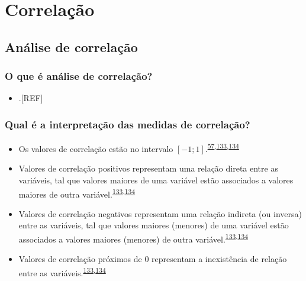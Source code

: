 \documentclass[
  a4paper,
]{book}
\providecommand{\tightlist}{%
  \setlength{\itemsep}{0pt}\setlength{\parskip}{0pt}}
\begin{document}
\hypertarget{analise-inferencial-correlacao}{%
\chapter{\texorpdfstring{\textbf{Correlação}}{Correlação}}\label{analise-inferencial-correlacao}}

\hypertarget{analise-correlacao}{%
\section{Análise de correlação}\label{analise-correlacao}}

\hypertarget{o-que-uxe9-anuxe1lise-de-correlauxe7uxe3o}{%
\subsection{O que é análise de correlação?}\label{o-que-uxe9-anuxe1lise-de-correlauxe7uxe3o}}

\begin{itemize}
\tightlist
\item
  .{[}REF{]}
\end{itemize}

\hypertarget{qual-uxe9-a-interpretauxe7uxe3o-das-medidas-de-correlauxe7uxe3o}{%
\subsection{Qual é a interpretação das medidas de correlação?}\label{qual-uxe9-a-interpretauxe7uxe3o-das-medidas-de-correlauxe7uxe3o}}

\begin{itemize}
\item
  Os valores de correlação estão no intervalo \([-1; 1]\).\textsuperscript{\protect\hyperlink{ref-barkan2015}{57},\protect\hyperlink{ref-khamis2008}{133},\protect\hyperlink{ref-allison2022}{134}}
\item
  Valores de correlação positivos representam uma relação direta entre as variáveis, tal que valores maiores de uma variável estão associados a valores maiores de outra variável.\textsuperscript{\protect\hyperlink{ref-khamis2008}{133},\protect\hyperlink{ref-allison2022}{134}}
\item
  Valores de correlação negativos representam uma relação indireta (ou inversa) entre as variáveis, tal que valores maiores (menores) de uma variável estão associados a valores maiores (menores) de outra variável.\textsuperscript{\protect\hyperlink{ref-khamis2008}{133},\protect\hyperlink{ref-allison2022}{134}}
\item
  Valores de correlação próximos de \(0\) representam a inexistência de relação entre as variáveis.\textsuperscript{\protect\hyperlink{ref-khamis2008}{133},\protect\hyperlink{ref-allison2022}{134}}
\end{itemize}
\end{document}
